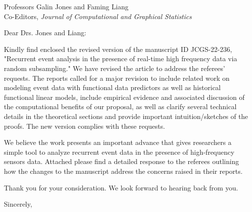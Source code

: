 \documentclass[11pt]{letter} %
\begin{document}

\begin{letter}{Professors Galin Jones and Faming Liang \\
    Co-Editors, {\em Journal of Computational and Graphical Statistics}
         }


\signature{Walter Dempsey\\
University of Michigan \\
Department of Biostatistics\\
M4057 SPH II \\
1415 Washington Heights \\
wdem@umich.edu} %


\date\today

\opening{Dear Drs. Jones and Liang:}

Kindly find enclosed the revised version of the manuscript ID JCGS-22-236, "Recurrent event analysis in the presence of real-time high frequency data via random subsampling."   We have revised the article to address the referees’ requests.  The reports called for a major revision to include related work on modeling event data with functional data predictors as well as historical functional linear models, include empirical evidence and associated discussion of the computational benefits of our proposal, as well as clarify several technical details in the theoretical sections and provide important intuition/sketches of the proofs. The new version complies with these requests.

We believe the work presents an important advance that gives researchers a simple tool to analyze recurrent event data in the presence of high-frequency sensors data.  Attached please find a detailed response to the referees outlining how the changes to the manuscript address the concerns raised in their reports.

Thank you for your consideration. We look forward to hearing back from you.

\closing{Sincerely,}


\end{letter}
\end{document}

